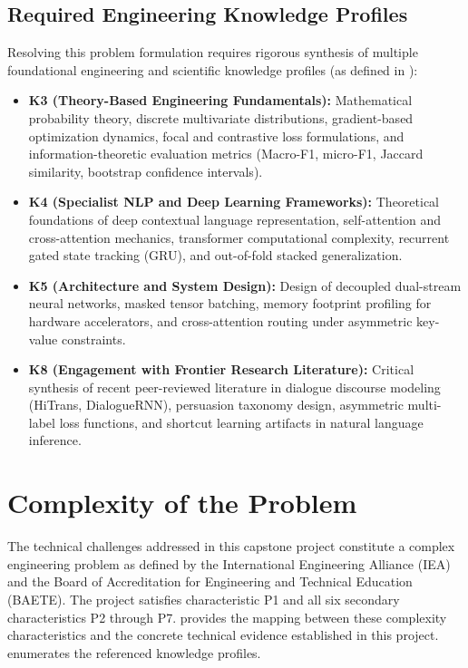 \subsection{Required Engineering Knowledge Profiles}
Resolving this problem formulation requires rigorous synthesis of multiple foundational engineering and scientific knowledge profiles (as defined in ):
\begin{itemize}
  \item \textbf{K3 (Theory-Based Engineering Fundamentals):} Mathematical probability theory, discrete multivariate distributions, gradient-based optimization dynamics, focal and contrastive loss formulations, and information-theoretic evaluation metrics (Macro-F1, micro-F1, Jaccard similarity, bootstrap confidence intervals).
  \item \textbf{K4 (Specialist NLP and Deep Learning Frameworks):} Theoretical foundations of deep contextual language representation, self-attention and cross-attention mechanics, transformer computational complexity, recurrent gated state tracking (GRU), and out-of-fold stacked generalization.
  \item \textbf{K5 (Architecture and System Design):} Design of decoupled dual-stream neural networks, masked tensor batching, memory footprint profiling for hardware accelerators, and cross-attention routing under asymmetric key-value constraints.
  \item \textbf{K8 (Engagement with Frontier Research Literature):} Critical synthesis of recent peer-reviewed literature in dialogue discourse modeling (HiTrans, DialogueRNN), persuasion taxonomy design, asymmetric multi-label loss functions, and shortcut learning artifacts in natural language inference.
\end{itemize}

\section{Complexity of the Problem}
\label{sec:complexity}

The technical challenges addressed in this capstone project constitute a complex engineering problem as defined by the International Engineering Alliance (IEA) and the Board of Accreditation for Engineering and Technical Education (BAETE). The project satisfies characteristic P1 and all six secondary characteristics P2 through P7.  provides the mapping between these complexity characteristics and the concrete technical evidence established in this project.  enumerates the referenced knowledge profiles.


